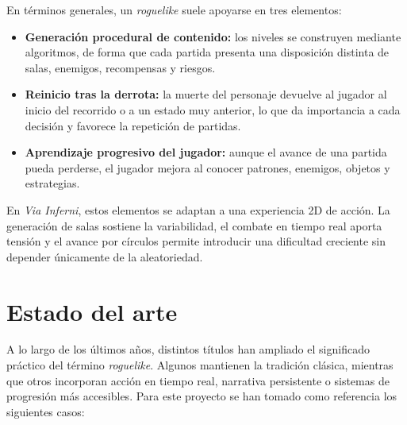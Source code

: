 En términos generales, un \textit{roguelike} suele apoyarse en tres elementos:

\begin{itemize}
    \item \textbf{Generación procedural de contenido:} los niveles se construyen mediante
    algoritmos, de forma que cada partida presenta una disposición distinta de salas,
    enemigos, recompensas y riesgos.
    
    \item \textbf{Reinicio tras la derrota:} la muerte del personaje devuelve al jugador
    al inicio del recorrido o a un estado muy anterior, lo que da importancia a cada
    decisión y favorece la repetición de partidas.
    
    \item \textbf{Aprendizaje progresivo del jugador:} aunque el avance de una partida
    pueda perderse, el jugador mejora al conocer patrones, enemigos, objetos y estrategias.
\end{itemize}

En \textit{Via Inferni}, estos elementos se adaptan a una experiencia 2D de acción. La
generación de salas sostiene la variabilidad, el combate en tiempo real aporta tensión y
el avance por círculos permite introducir una dificultad creciente sin depender
únicamente de la aleatoriedad.

\section{Estado del arte}

A lo largo de los últimos años, distintos títulos han ampliado el significado práctico del
término \textit{roguelike}. Algunos mantienen la tradición clásica, mientras que otros
incorporan acción en tiempo real, narrativa persistente o sistemas de progresión más
accesibles. Para este proyecto se han tomado como referencia los siguientes casos:

